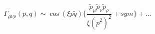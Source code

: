\begin{equation}
 \Gamma_{\mu \nu \rho}(p,q) \sim \cos(\xi p \tilde{q})
 \{ \frac{ \tilde{p}_{\mu} \tilde{p}_{\nu}  \tilde{p}_{\rho}}
{\xi(\tilde{p}^2)^2}+ sym \}+ \ldots
 \label{7}
 \end{equation}

